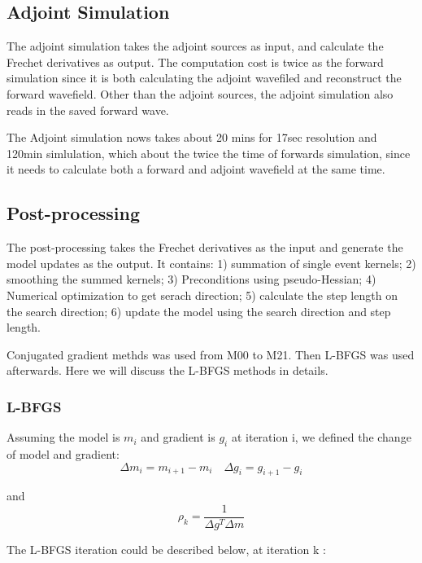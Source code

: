 \documentclass[extra,mreferee]{gji}
\begin{document}
\subsection{Adjoint Simulation}
The adjoint simulation takes the adjoint sources as input, and calculate the Frechet derivatives as output. The computation cost is twice as the forward simulation since it is both calculating the adjoint wavefiled and reconstruct the forward wavefield. Other than the adjoint sources, the adjoint simulation also reads in the saved forward wave.

The Adjoint simulation nows takes about 20 mins for 17sec resolution and 120min simlulation, which about the twice the time of forwards simulation, since it needs to calculate both a forward and adjoint wavefield at the same time.

\subsection{Post-processing}
The post-processing takes the Frechet derivatives as the input and generate the model updates as the output. It contains: 1) summation of single event kernels; 2) smoothing the summed kernels; 3) Preconditions using pseudo-Hessian; 4) Numerical optimization to get serach direction; 5) calculate the step length on the search direction; 6) update the model using the search direction and step length.

Conjugated gradient methds was used from M00 to M21. Then L-BFGS was used afterwards. Here we will discuss the L-BFGS methods in details.

\subsubsection{L-BFGS}

Assuming the model is $m_i$ and gradient is $g_i$ at iteration i, we defined the change of model and gradient:\\
\begin{equation*}
    \Delta m_i = m_{i+1} - m_i \quad
    \Delta g_i = g_{i+1} - g_i
\end{equation*}

and \\
\begin{equation*}
     \rho_k = \frac{1}{\Delta g^{T} \Delta m}
\end{equation*}

The L-BFGS iteration could be described below, at iteration k \citep{wright1999numerical}:
\end{document}
